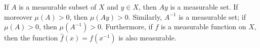 If $A$ is a measurable subset of $X$ and $y \in X$, then $Ay$ is a measurable set. If moreover $\mu(A) > 0$, then $\mu(Ay) > 0$. Similarly, $A^{-1}$ is a measurable set; if $\mu(A) > 0$, then $\mu(A^{-1}) > 0$. Furthermore, if $f$ is a measurable function on $X$, then the function $\hat{f}(x) = f(x^{-1})$ is also measurable.
